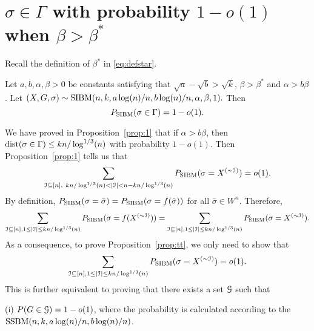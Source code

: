 \documentclass{article}
\begin{document}
\section{$\sigma \in \Gamma$ with probability $1-o(1)$ when $\beta>\beta^\ast$} \label{sect:equal}

Recall the definition of $\beta^\ast$ in \eqref{eq:defstar}.
\begin{proposition} \label{prop:tt}
Let $a,b,\alpha,\beta> 0$ be constants satisfying that $\sqrt{a}-\sqrt{b} > \sqrt{k}$, $\beta>\beta^\ast$ and $\alpha>b\beta$. 
Let 
$
(X,G,\sigma) \sim \operatorname{SIBM}(n,k, a\log(n)/n, b\log(n)/n,\alpha,\beta, 1) .
$
Then
$$
P_{\operatorname{SIBM}}(\sigma \in \Gamma)=1-o(1) .
$$
\end{proposition}

We have proved in Proposition~\ref{prop:1} that if $\alpha>b\beta$, then $\operatorname{dist}(\sigma \in \Gamma) \le kn/\log^{1/3}(n)$
 with probability $1-o(1)$.
Then Proposition~\ref{prop:1} tells us that
$$
\sum_{\cI\subseteq[n],~
kn/\log^{1/3}(n)<|\cI|<n-kn/\log^{1/3}(n)} P_{\SIBM}(\sigma=X^{(\sim\cI)})  = o(1) .
$$
By definition, $P_{\operatorname{SIBM}}(\sigma=\bar{\sigma})=P_{\operatorname{SIBM}}(\sigma=f(\bar{\sigma}))$ for all $\bar{\sigma}\in W^n$. Therefore, 
$$
\sum_{\mathcal{I}\subseteq[n],1\le |\mathcal{I}|\le kn/\log^{1/3}(n)} P_{\operatorname{SIBM}}(\sigma=f(X^{(\sim\mathcal{I})})) =\sum_{\mathcal{I}\subseteq[n],1\le |\mathcal{I}|\le kn/\log^{1/3}(n)} P_{\operatorname{SIBM}}(\sigma=X^{(\sim\mathcal{I})}).
$$
As a consequence, to prove Proposition~\ref{prop:tt}, we only need to show that
$$
\sum_{\mathcal{I}\subseteq[n],1\le |\mathcal{I}|\le kn/\log^{1/3}(n)} P_{\operatorname{SIBM}}(\sigma=X^{(\sim\mathcal{I})}) 
= o(1) .
$$
This is further equivalent to proving that there exists a set $\mathcal{G}$ such that

\noindent (i)
$P(G\in\mathcal{G})=1-o(1)$, where the probability is calculated according to the $\SSBM(n, k,a\log(n)/n, \linebreak[4] b\log(n)/n)$.
\end{document}
